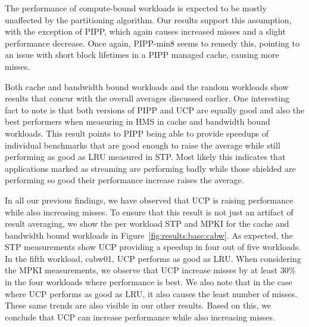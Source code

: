 The performance of compute-bound workloads is expected to be mostly unaffected by the partitioning algorithm. 
Our results support this assumption, with the exception of PIPP, which again causes increased misses and a slight performance decrease.
Once again, PIPP-min8 seems to remedy this, pointing to an issue with short block lifetimes in a PIPP managed cache, causing more misses.

Both cache and bandwidth bound workloads and the random workloads show results that concur with the overall averages discussed earlier.
One interesting fact to note is that both versions of PIPP and UCP are equally good and also the best performers when measuring in HMS in cache and bandwidth bound workloads.
This result points to PIPP being able to provide speedups of individual benchmarks that are good enough to raise the average while still performing as good as LRU measured in STP.
Most likely this indicates that applications marked as streaming are performing badly while those shielded are performing so good their performance increase raises the average.


In all our previous findings, we have observed that UCP is raising performance while also increasing misses.
To ensure that this result is not just an artifact of result averaging, we show the per workload STP and MPKI for the cache and bandwidth bound workloads in Figure~\ref{fig:results:base:cabw}.
As expected, the STP measurements show UCP providing a speedup in four out of five workloads.
In the fifth workload, cabw01, UCP performs as good as LRU.
When considering the MPKI measurements, we observe that UCP increase misses by at least 30\% in the four workloads where performance is best.
We also note that in the case where UCP performs as good as LRU, it also causes the least number of misses.
These same trends are also visible in our other results.
Based on this, we conclude that UCP can increase performance while also increasing misses.